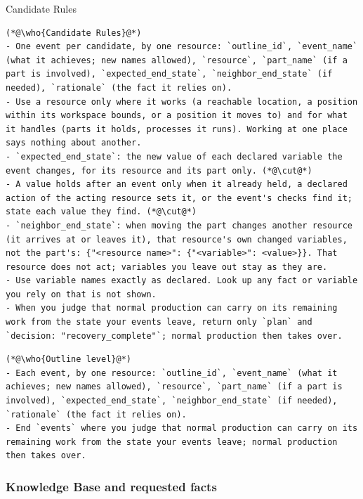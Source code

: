\begin{recbox}{Candidate Rules}
\begin{lstlisting}
(*@\who{Candidate Rules}@*)
- One event per candidate, by one resource: `outline_id`, `event_name` (what it achieves; new names allowed), `resource`, `part_name` (if a part is involved), `expected_end_state`, `neighbor_end_state` (if needed), `rationale` (the fact it relies on).
- Use a resource only where it works (a reachable location, a position within its workspace bounds, or a position it moves to) and for what it handles (parts it holds, processes it runs). Working at one place says nothing about another.
- `expected_end_state`: the new value of each declared variable the event changes, for its resource and its part only. (*@\cut@*)
- A value holds after an event only when it already held, a declared action of the acting resource sets it, or the event's checks find it; state each value they find. (*@\cut@*)
- `neighbor_end_state`: when moving the part changes another resource (it arrives at or leaves it), that resource's own changed variables, not the part's: {"<resource name>": {"<variable>": <value>}}. That resource does not act; variables you leave out stay as they are.
- Use variable names exactly as declared. Look up any fact or variable you rely on that is not shown.
- When you judge that normal production can carry on its remaining work from the state your events leave, return only `plan` and `decision: "recovery_complete"`; normal production then takes over.
\end{lstlisting}

\vspace{3pt}
\begin{lstlisting}
(*@\who{Outline level}@*)
- Each event, by one resource: `outline_id`, `event_name` (what it achieves; new names allowed), `resource`, `part_name` (if a part is involved), `expected_end_state`, `neighbor_end_state` (if needed), `rationale` (the fact it relies on).
- End `events` where you judge that normal production can carry on its remaining work from the state your events leave; normal production then takes over.
\end{lstlisting}
\end{recbox}

\subsubsection{Knowledge Base and requested facts}\label{sec:block-kb}


